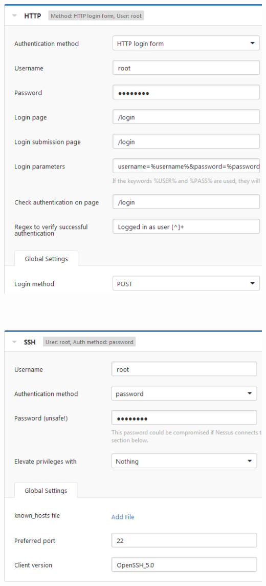 \documentclass[11pt, a4paper]{article}
\begin{document}
\noindent\begin{minipage}{\textwidth}
    \centering
    \includegraphics[width=\textwidth]{Nessus_10.png}
\end{minipage}
$\;$ \\ \\
\noindent\begin{minipage}{\textwidth}
    \centering
    \includegraphics[width=\textwidth]{Nessus_11.png}
\end{minipage}
\end{document}
